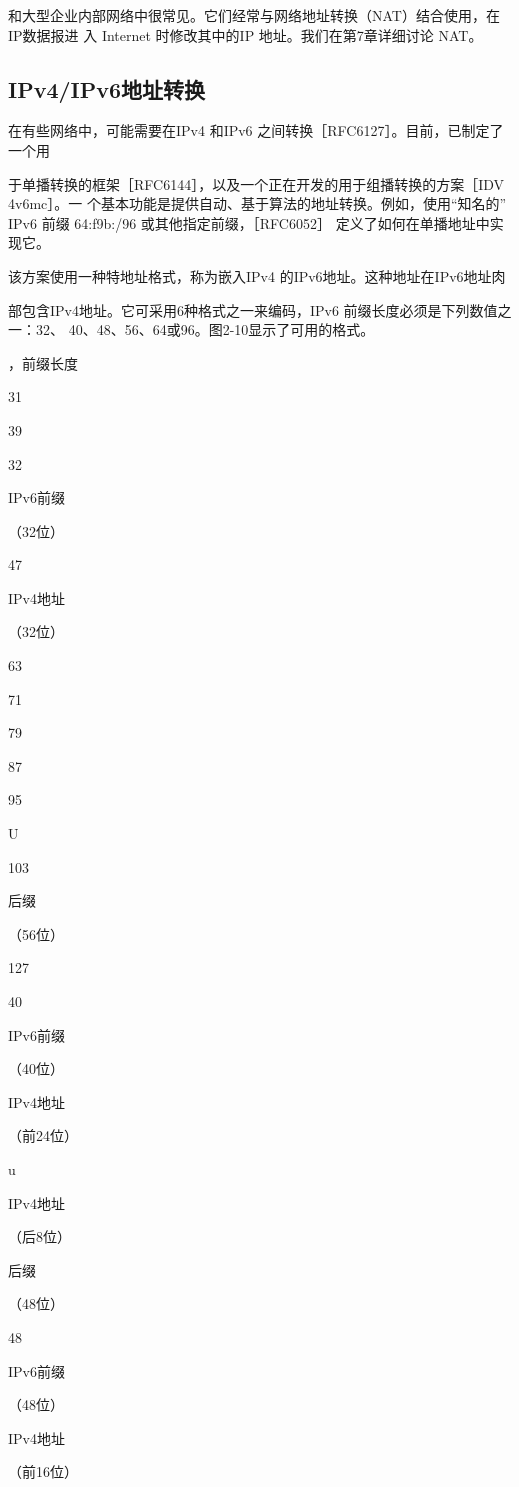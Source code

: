 和大型企业内部网络中很常见。它们经常与网络地址转换（NAT）结合使用，在IP数据报进
入 Internet 时修改其中的IP 地址。我们在第7章详细讨论 NAT。

\subsection{IPv4/IPv6地址转换}
在有些网络中，可能需要在IPv4 和IPv6 之间转换［RFC6127］。目前，已制定了一个用

于单播转换的框架［RFC6144］，以及一个正在开发的用于组播转换的方案［IDV 4v6mc］。一
个基本功能是提供自动、基于算法的地址转换。例如，使用“知名的” IPv6 前缀 64:f9b:/96
或其他指定前缀，［RFC6052］ 定义了如何在单播地址中实现它。

该方案使用一种特地址格式，称为嵌入IPv4 的IPv6地址。这种地址在IPv6地址肉

部包含IPv4地址。它可采用6种格式之一来编码，IPv6 前缀长度必须是下列数值之一：32、
40、48、56、64或96。图2-10显示了可用的格式。

，前缀长度

31

39

32

IPv6前缀

（32位）

47

IPv4地址

（32位）

63

71

79

87

95

U

103

后缀

（56位）

127

40

IPv6前缀

（40位）

IPv4地址

（前24位）

u

IPv4地址

（后8位）

后缀

（48位）

48

IPv6前缀

（48位）

IPv4地址

（前16位）


